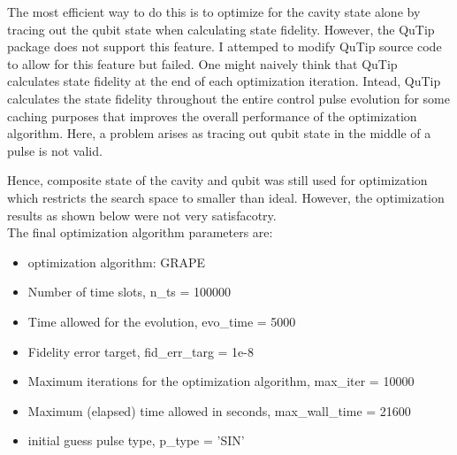 \documentclass[12pt]{report}
\begin{document}
The most efficient way to do this is to optimize for the cavity state alone by tracing out the qubit state when calculating state fidelity. 
However, the QuTip package does not support this feature. I attemped to modify QuTip source code to allow for this feature but failed. 
One might naively think that QuTip calculates state fidelity at the end of each optimization iteration. 
Intead, QuTip calculates the state fidelity throughout the entire control pulse evolution for some caching purposes that improves the overall performance of the optimization algorithm. 
Here, a problem arises as tracing out qubit state in the middle of a pulse is not valid. 
\par
Hence, composite state of the cavity and qubit was still used for optimization which restricts the search space to smaller than ideal. 
However, the optimization results as shown below were not very satisfacotry. 
\\
The final optimization algorithm parameters are:
\begin{itemize}
    \item optimization algorithm: GRAPE
    \item Number of time slots, n\_ts = 100000
    \item Time allowed for the evolution, evo\_time = 5000
    \item Fidelity error target, fid\_err\_targ = 1e-8
    \item Maximum iterations for the optimization algorithm, max\_iter = 10000
    \item Maximum (elapsed) time allowed in seconds, max\_wall\_time = 21600
    \item initial guess pulse type, p\_type = 'SIN'
\end{itemize}
\end{document}
